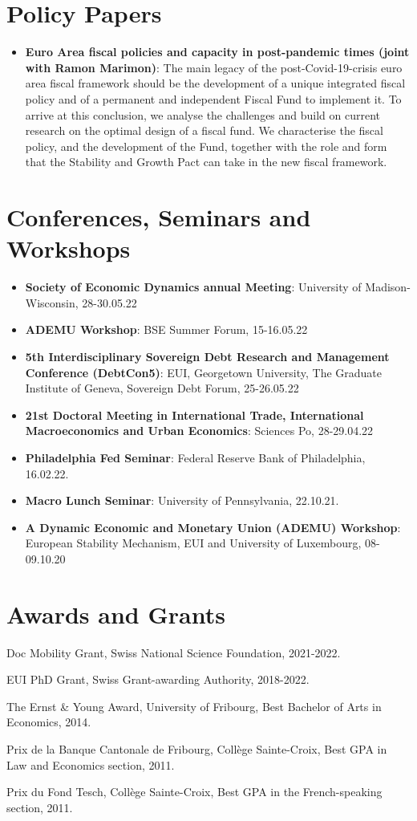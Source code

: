 \documentclass[letterpaper,10.8pt]{article}
\newcommand{\resumeItem}[2]{
  \item\small{
    \textbf{#1}{: #2 \vspace{-2pt}}
  }
}
\newcommand{\resumeSubItem}[2]{\resumeItem{#1}{#2}\vspace{-4pt}}
\newcommand{\resumeSubHeadingListStart}{\begin{itemize}[leftmargin=*]}
\newcommand{\resumeSubHeadingListEnd}{\end{itemize}}
\begin{document}
\section{Policy Papers}
\resumeSubHeadingListStart
\resumeSubItem{Euro Area fiscal policies and capacity in post-pandemic times (joint with Ramon Marimon)}{The main legacy of the post-Covid-19-crisis euro area fiscal framework should be the development of a unique integrated fiscal policy and of a permanent and independent Fiscal Fund to implement it. To arrive at this conclusion, we analyse the challenges and build on current research on the optimal design of a fiscal fund. We characterise the fiscal policy, and the development of the Fund, together with the role and form that the Stability and Growth Pact can take in the new fiscal framework.}
\resumeSubHeadingListEnd

\section{Conferences, Seminars and Workshops}
\resumeSubHeadingListStart
\resumeSubItem{Society of Economic Dynamics annual Meeting}{University of Madison-Wisconsin, 28-30.05.22}
\resumeSubItem{ADEMU Workshop}{BSE Summer Forum, 15-16.05.22}
\resumeSubItem{5th Interdisciplinary Sovereign Debt Research and Management Conference (DebtCon5)}{EUI, Georgetown University, The Graduate Institute of Geneva, Sovereign Debt Forum, 25-26.05.22}
\resumeSubItem{21st Doctoral Meeting in International Trade, International Macroeconomics and Urban Economics}{Sciences Po, 28-29.04.22}
\resumeSubItem{Philadelphia Fed Seminar}{Federal Reserve Bank of Philadelphia, 16.02.22.}
\resumeSubItem{Macro Lunch Seminar}{University of Pennsylvania, 22.10.21.}
\resumeSubItem{A Dynamic Economic and Monetary Union (ADEMU) Workshop}{European Stability Mechanism, EUI and University of Luxembourg, 08-09.10.20}
\resumeSubHeadingListEnd

\section{Awards and Grants}
\begin{description}[font=$\bullet$]
\item {Doc Mobility Grant, Swiss National Science Foundation, 2021-2022.} 
\item {EUI PhD Grant, Swiss Grant-awarding Authority, 2018-2022.} 
\item {The Ernst \& Young Award, University of Fribourg, Best Bachelor of Arts in Economics, 2014.} 
\item {Prix de la Banque Cantonale de Fribourg, Coll\`{e}ge Sainte-Croix, Best GPA in Law and Economics section, 2011.}
\item {Prix du Fond Tesch, Coll\`{e}ge Sainte-Croix, Best GPA in the French-speaking section, 2011.}
\end{description}
\end{document}
